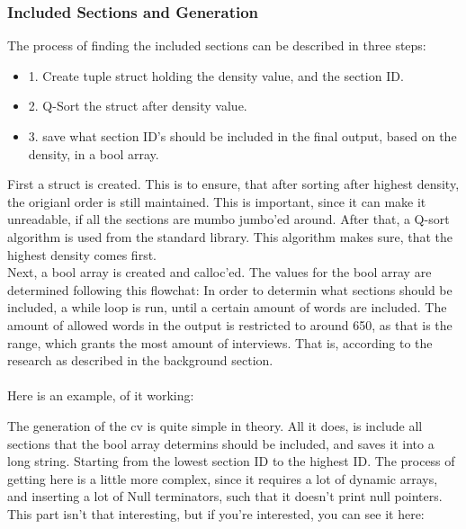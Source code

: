 \subsubsection{Included Sections and Generation}
The process of finding the included sections can be described in three steps:
\begin{itemize}
  \item 1. Create tuple struct holding the density value, and the section ID.
  \item 2. Q-Sort the struct after density value.
  \item 3. save what section ID's should be included in the final output, based on the density, in a bool array.
\end{itemize}
First a struct is created. This is to ensure, that after sorting after highest density, the origianl order is still maintained.
This is important, since it can make it unreadable, if all the sections are mumbo jumbo'ed around.
After that, a Q-sort algorithm is used from the standard library. This algorithm makes sure, that the highest density comes first.
\\
Next, a bool array is created and calloc'ed. The values for the bool array are determined following this flowchat:
In order to determin what sections should be included, a while loop is run, until a certain amount of words are included.
The amount of allowed words in the output is restricted to around 650, as that is the range, which grants the most amount of interviews.
That is, according to the research as described in the background section.
\\ \\
Here is an example, of it working: 

The generation of the cv is quite simple in theory. All it does, is include all sections that the bool array determins should be included, and saves it into a long string.
Starting from the lowest section ID to the highest ID. 
The process of getting here is a little more complex, since it requires a lot of dynamic arrays, and inserting a lot of Null terminators, such  that it doesn't print null pointers.
This part isn't that interesting, but if you're interested, you can see it here:

